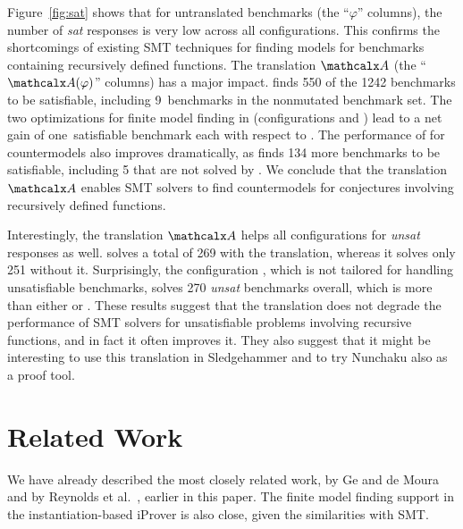 Figure~\ref{fig:sat} shows that for untranslated benchmarks (the ``$\varphi$''
columns), the number of \emph{sat} responses is very low across all
configurations. This confirms the shortcomings of existing SMT techniques for
finding models for benchmarks containing recursively defined functions.
%
The translation $\conv$ (the ``$\conv(\varphi)$'' columns) has a major
impact. \cvcf finds 550 of the 1242 benchmarks to be satisfiable,
including 9~benchmarks in the nonmutated \leon benchmark set. 
The two optimizations for finite model finding in \cvc (configurations \cvcfe and \cvcfm) 
lead to a net gain of one~satisfiable benchmark each with respect to \cvcf.
The performance of \ziiib for countermodels also improves dramatically, as \ziiib
finds 134 more benchmarks to be satisfiable, including 5 that are not solved by \cvcf.
%
We conclude that the translation $\conv$ enables SMT
solvers to find countermodels for conjectures involving recursively defined
functions.  %

Interestingly,
the translation $\conv$ helps all configurations for \emph{unsat} responses as well.
\ziii solves a total of 269 with the translation, whereas it solves only 251 without it.
Surprisingly,
the configuration \cvcf, which is not tailored for handling unsatisfiable benchmarks,
solves 270 \emph{unsat} benchmarks overall, which is more than either \cvcd or \ziii.
These results suggest that the translation does not degrade the performance
of SMT solvers for unsatisfiable problems involving recursive functions,
and in fact it often improves it. 
They also suggest that it might be interesting to use this translation
in Sledgehammer \cite{blanchette-et-al-2013-smt} and to try Nunchaku also as a
proof tool.

\section{Related Work}
\label{sec:related-work}

We have already described the most closely related work, by Ge and de Moura
\cite{GeDeM-CAV-09} and by Reynolds et al.\
\cite{ReyEtAl-1-RR-13,reynolds-et-al-2013}, earlier in this paper.
The finite model finding support in the instantiation-based iProver
\cite{korovin-2013} is also close, given the similarities with SMT.


